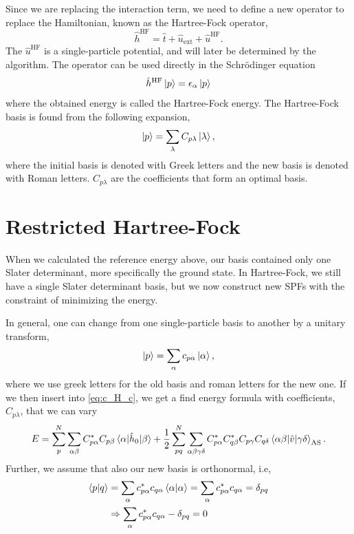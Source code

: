 Since we are replacing the interaction term, we need to define a new operator to replace the Hamiltonian, known as the Hartree-Fock operator,
\begin{equation}
\hat{h}^{\text{HF}}=\hat{t} + \hat{u}_{\text{ext}} + \hat{u}^{\text{HF}}.
\end{equation}
The $\hat{u}^{\text{HF}}$ is a single-particle potential, and will later be determined by the algorithm. The operator can be used directly in the Schrödinger equation 
\begin{equation}
\hat{h}^{\text{HF}}\ket{p}=\epsilon_{\alpha}\ket{p}
\end{equation}
where the obtained energy is called the Hartree-Fock energy. The Hartree-Fock basis is found from the following expansion,
\begin{equation}
\ket{p}=\sum_{\lambda}C_{p\lambda}\ket{\lambda},
\end{equation}
where the initial basis is denoted with Greek letters and the new basis is denoted with Roman letters. $C_{p\lambda}$ are the coefficients that form an optimal basis. 

\section{Restricted Hartree-Fock}
When we calculated the reference energy above, our basis contained only one Slater determinant, more specifically the ground state. In Hartree-Fock, we still have a single Slater determinant basis, but we now construct new SPFs with the constraint of minimizing the energy. 

In general, one can change from one single-particle basis to another by a unitary transform,
\begin{equation}
\ket{p}=\sum_{\alpha}c_{p\alpha}\ket{\alpha},
\end{equation}
where we use greek letters for the old basis and roman letters for the new one. If we then insert into \eqref{eq:c_H_c}, we get a find energy formula with coefficients, $C_{p\lambda}$, that we can vary
\begin{equation}
E=\sum_{p}^N\sum_{\alpha\beta}C_{p\alpha}^*C_{p\beta}\mel{\alpha}{\hat{h}_0}{\beta}+\frac{1}{2}
\sum_{pq}^N\sum_{\alpha\beta\gamma\delta}C_{p\alpha}^*C_{q\beta}^*C_{p\gamma}C_{q\delta}\mel{\alpha\beta}{\hat{v}}{\gamma\delta}_{\text{AS}}.
\end{equation}
Further, we assume that also our new basis is orthonormal, i.e,
\begin{align}
	\braket{p}{q}&=\sum_{\alpha}c_{p\alpha}^*c_{q\alpha}\braket{\alpha}{\alpha}=\sum_{\alpha}c_{p\alpha}^*c_{q\alpha}=\delta_{pq}\\
	&\Rightarrow\sum_{\alpha}c_{p\alpha}^*c_{q\alpha}-\delta_{pq}=0\label{eq:constraint}
\end{align}

